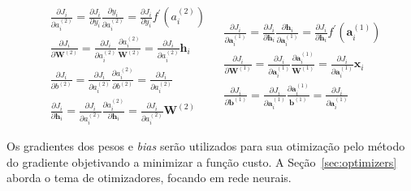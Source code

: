 \begin{subequations} \label{eq:nn-backprop}
\begin{align}
    &\frac{\partial{J_i}}{\partial{a_i^{(2)}}}
        = \frac{\partial{J_i}}{\partial{y_i}} \frac{\partial{y_i}}{\partial{a_i^{(2)}}}
        = \frac{\partial{J_i}}{\partial{y_i}} f^{\prime}(a_i^{(2)}) \label{eq:nn-backprop-a2}\\
    &\frac{\partial{J_i}}{\partial{\mathbf{W}^{(2)}}}
        = \frac{\partial{J_i}}{\partial{a_i^{(2)}}} \frac{\partial{a_i^{(2)}}}{\mathbf{W}^{(2)}}
        = \frac{\partial{J_i}}{\partial{a_i^{(2)}}} \mathbf{h}_i \label{eq:nn-backprop-w2}\\
    &\frac{\partial{J_i}}{\partial{b^{(2)}}}
        = \frac{\partial{J_i}}{\partial{a_i^{(2)}}} \frac{\partial{a_i^{(2)}}}{\partial{b^{(2)}}}
        = \frac{\partial{J_i}}{\partial{a_i^{(2)}}} \label{eq:nn-backprop-b2}\\
    &\frac{\partial{J_i}}{\partial{\mathbf{h}_i}}
        = \frac{\partial{J_i}}{\partial{a_i^{(2)}}} \frac{\partial{a_i^{(2)}}}{\partial{\mathbf{h}_i}}
        = \frac{\partial{J_i}}{\partial{a_i^{(2)}}} \mathbf{W}^{(2)} \label{eq:nn-backprop-h}
\end{align}

\begin{align}
    &\frac{\partial{J_i}}{\partial{\mathbf{a}_i^{(1)}}}
        = \frac{\partial{J_i}}{\partial{\mathbf{h}_i}} \frac{\partial{\mathbf{h}_i}}{\partial{\mathbf{a}_i^{(1)}}}
        = \frac{\partial{J_i}}{\partial{\mathbf{h}_i}} f^{\prime}(\mathbf{a}_i^{(1)})\\
    &\frac{\partial{J_i}}{\partial{\mathbf{W}^{(1)}}}
        = \frac{\partial{J_i}}{\partial{\mathbf{a}_i^{(1)}}} \frac{\partial{\mathbf{a}_i^{(1)}}}{\mathbf{W}^{(1)}}
        = \frac{\partial{J_i}}{\partial{\mathbf{a}_i^{(1)}}} \mathbf{x}_i \label{eq:nn-backprop-w1}\\
    &\frac{\partial{J_i}}{\partial{\mathbf{b}^{(1)}}}
        = \frac{\partial{J_i}}{\partial{\mathbf{a}_i^{(1)}}} \frac{\partial{\mathbf{a}_i^{(1)}}}{\mathbf{b}^{(1)}}
        = \frac{\partial{J_i}}{\partial{\mathbf{a}_i^{(1)}}} \label{eq:nn-backprop-b1}
\end{align}
\end{subequations}

Os gradientes dos pesos e \textit{bias} serão utilizados para sua otimização pelo método do gradiente objetivando a
minimizar a função custo.
A Seção~\ref{sec:optimizers} aborda o tema de otimizadores, focando em rede neurais.

